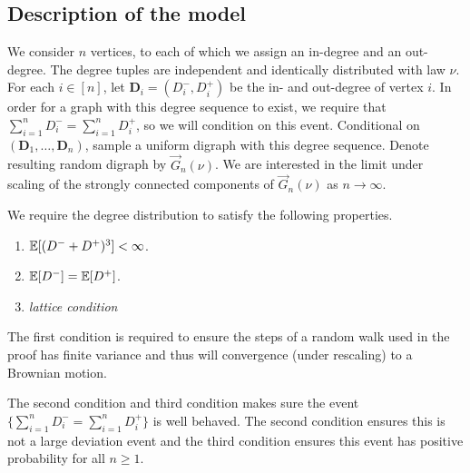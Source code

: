 \subsection{Description of the model}

We consider $n$ vertices, to each of which we assign an in-degree and an out-degree. The degree tuples are independent and identically distributed with law $\nu$. For each $i\in [n]$, let $\mathbf{D}_i=(D^-_i,D^+_i)$ be the in- and out-degree of vertex $i$. In order for a graph with this degree sequence to exist, we require that $\sum_{i=1}^n D^-_i=\sum_{i=1}^n D^+_i$, so we will condition on this event. Conditional on $(\mathbf{D}_1,\dots,\mathbf{D}_n)$, sample a uniform digraph with this degree sequence. Denote resulting random digraph by $\vec{G}_n(\nu)$. We are interested in the limit under scaling of the strongly connected components of $\vec{G}_n(\nu)$ as $n\to \infty$.

We require the degree distribution to satisfy the following properties.

\begin{enumerate}
    \item ${\mathbb E}[(D^- + D^+)^3] < \infty$.
    \item ${\mathbb E}[D^-] = {\mathbb E}[D^+]$.
    \item \emph{lattice condition}
\end{enumerate}

The first condition is required to ensure the steps of a random walk used in the proof has finite variance and thus will convergence (under rescaling) to a Brownian motion.

The second condition and third condition makes sure the event $\{\sum_{i=1}^n D^-_i = \sum_{i=1}^n D^+_i\}$ is well behaved. The second condition ensures this is not a large deviation event and the third condition ensures this event has positive probability for all $n \geq 1$. 


